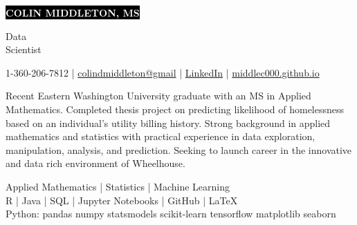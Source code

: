 \documentclass[11pt]{developercv} %
\newcommand{\vsp}{\vspace{-10pt}}
\begin{document}
\setlength{\abovedisplayskip}{0pt}
\setlength{\belowdisplayskip}{0pt}

\begin{minipage}{0.75\textwidth}
	\colorbox{black}{{\HUGE\textcolor{white}{\textbf{\MakeUppercase{Colin Middleton, MS}}}}}
\end{minipage}
\begin{minipage}{0.25\textwidth}
	{\huge Data \\Scientist}
\end{minipage}

\vspace{-5pt}
\begin{center}
	1-360-206-7812
	\hspace{0.25cm} | \hspace{0.25cm}
	\href{mailto:colindmiddleton@gmail.com}{colindmiddleton@gmail}
	\hspace{0.25cm} | \hspace{0.25cm}
	\href{https://www.linkedin.com/in/colin-middleton-000/}{LinkedIn}
	\hspace{0.25cm} | \hspace{0.25cm}
	\href{https://middlec000.github.io/}{middlec000.github.io}
\end{center}
\vsp


Recent Eastern Washington University graduate with an MS in Applied Mathematics. Completed thesis project on predicting likelihood of homelessness based on an individual's utility billing history. Strong background in applied mathematics and statistics with practical experience in data exploration, manipulation, analysis, and prediction. Seeking to launch career in the innovative and data rich environment of Wheelhouse.

\vsp
\begin{center}
	Applied Mathematics \quad | \quad Statistics \quad | \quad Machine Learning
	\\
	\vspace{0.25cm}
	R \quad | \quad Java \quad | \quad SQL \quad | \quad
	Jupyter Notebooks \quad | \quad GitHub \quad | \quad LaTeX
	\\
	\vspace{0.25cm}
	Python: \quad pandas \quad numpy \quad statsmodels \quad scikit-learn \quad tensorflow \quad matplotlib \quad seaborn
\end{center}
\vsp
\end{document}
